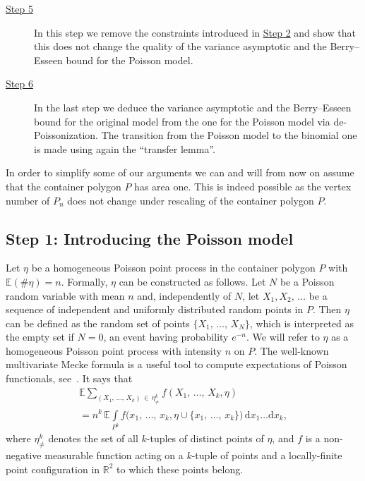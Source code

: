 \documentclass[10pt]{amsart}
\theoremstyle{definition}\newtheorem{defi}[theo]{Definition}\newtheorem{rema}[theo]{Remark}\newtheorem{exam}[theo]{Example}\newtheorem{exem}[theo]{Example}\newtheorem{nota}[theo]{Notation}
\newcommand{\bbR}{\mathbb{R}}
\newcommand{\bbE}{\mathbb{E}}
\begin{document}
\begin{description}
\item[{\hyperref[step5]{Step 5}}] In this step we remove the constraints introduced in \hyperref[step2]{Step 2} and show that this does not change the quality of the variance asymptotic and the Berry--Esseen bound for the Poisson model.

\item[{\hyperref[sec:dePoisson]{Step 6}}] In the last step we deduce the variance asymptotic and the Berry--Esseen bound for the original model from the one for the Poisson model via de-Poissonization. The transition from the Poisson model to the binomial one is made using again the ``transfer lemma''.
\end{description}

In order to simplify some of our arguments we can and will from now on assume that the container polygon $P$ has area one. This is indeed possible as the vertex number of $P_n$ does not change under rescaling of the container polygon $P$.


\subsection{Step 1: Introducing the Poisson model} \label{subsec1}

Let $\eta$ be a homogeneous Poisson point process in the container polygon $P$ with $\bbE(\#\eta) = n$. Formally, $\eta$ can be constructed as follows. Let $N$ be a Poisson random variable with mean $n$ and, independently of $N$, let $X_1,X_2,\,\ldots$ be a sequence of independent and uniformly distributed random points in $P$. Then $\eta$ can be defined as the random set of points $\{X_1,\,\ldots,\,X_N\}$, which is interpreted as the empty set if $N=0$, an event having probability $e^{-n}$. We will refer to $\eta$ as a homogeneous Poisson point process with intensity $n$ on $P$. The well-known multivariate Mecke formula is a useful tool to compute expectations of Poisson functionals, see~\cite[Theorem~4.1]{LP}. It says that
\begin{multline}\label{eq:Mecke}
\bbE \sum_{(X_1,\,\ldots,\,X_k)\,\in\,\eta^k_{\neq}} f(X_1,\,\ldots,\,X_k,\eta) \\
= n^k \, \bbE \int\limits_{P^k} f\big(x_1,\,\ldots,\,x_k,\eta\cup\{x_1,\,\ldots,\,x_k\}\big)\,\mathrm{d} x_1\ldots \mathrm{d} x_k,
\end{multline}
where $\eta^k_{\neq}$ denotes the set of all $k$-tuples of distinct points of $\eta$, and $f$ is a non-negative measurable function acting on a $k$-tuple of points and a locally-finite point configuration in $\bbR^2$ to which these points belong.
\end{document}
